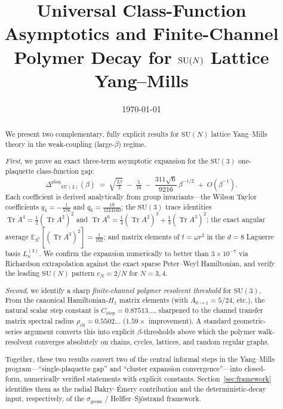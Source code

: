 \documentclass[11pt,a4paper]{article}
\title{\bfseries Universal Class-Function Asymptotics and Finite-Channel
Polymer Decay for $\SU(N)$ Lattice Yang--Mills}
\author{}
\date{\today}
\theoremstyle{definition}
\newcommand{\SU}{\mathrm{SU}}
\newcommand{\Tr}{\operatorname{Tr}}
\newcommand{\E}{\mathbb{E}}
\newcommand{\Gap}{{\Delta^{\mathrm{plaq}}}}
\begin{document}
\maketitle

\begin{abstract}
We present two complementary, fully explicit results for $\SU(N)$
lattice Yang--Mills theory in the weak-coupling (large-$\beta$) regime.

\emph{First}, we prove an exact three-term asymptotic expansion for
the $\SU(3)$ one-plaquette class-function gap:
\[
\Gap_{\SU(3)}(\beta)
\;=\;
\sqrt{\tfrac{2\beta}{3}}
\;-\;\tfrac{5}{16}
\;-\;\frac{311\sqrt{6}}{9216}\,\beta^{-1/2}
\;+\;O(\beta^{-1}).
\]
Each coefficient is derived analytically from group invariants---the
Wilson Taylor coefficients $q_4 = -\tfrac{1}{576}$ and
$q_6 = \tfrac{19}{1244160}$; the $\SU(3)$ trace identities
$\Tr A^4 = \tfrac{1}{2}(\Tr A^2)^2$ and
$\Tr A^6 = \tfrac{1}{4}(\Tr A^2)^3 + \tfrac{1}{3}(\Tr A^3)^2$; the
exact angular average $\E_{S^7}[(\Tr A^3)^2] = \tfrac{1}{192}$; and
matrix elements of $t = \omega r^2$ in the $d=8$ Laguerre basis
$L_n^{(3)}$. We confirm the expansion numerically to better than
$3\times 10^{-7}$ via Richardson extrapolation against the exact sparse
Peter--Weyl Hamiltonian, and verify the leading $\SU(N)$ pattern
$c_N = 2/N$ for $N=3,4$.

\emph{Second}, we identify a sharp \emph{finite-channel polymer
resolvent threshold} for $\SU(3)$. From the canonical Hamiltonian-$H_1$
matrix elements (with $A_{0\to 1}=5/24$, etc.), the natural scalar step
constant is $C_{\mathrm{step}} = 0.87513\ldots$, sharpened to the
channel transfer matrix spectral radius $\rho_{\mathrm{ch}}=0.5502\ldots$
($1.59\times$ improvement). A standard geometric-series argument
converts this into explicit $\beta$-thresholds above which the polymer
walk-resolvent converges absolutely on chains, cycles, lattices, and
random regular graphs.

Together, these two results convert two of the central informal steps
in the Yang--Mills program---``single-plaquette gap'' and
``cluster expansion convergence''---into closed-form, numerically
verified statements with explicit constants. Section~\ref{sec:framework}
identifies them as the radial Bakry--\'Emery contribution and the
deterministic-decay input, respectively, of the
$\sigma_{\mathrm{geom}}$ / Helffer--Sj\"ostrand framework.
\end{abstract}

\tableofcontents
\end{document}
